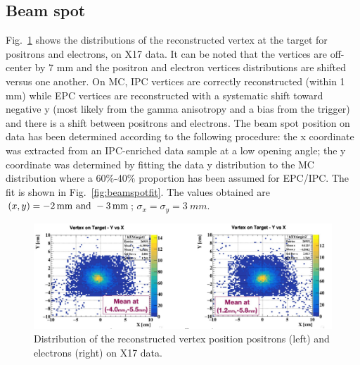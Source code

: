 \begin{refsection}
        \subsection{Beam spot}
        Fig.~\ref{fig:beamspot1} shows the distributions of the reconstructed vertex at the target for positrons and electrons, on X17 data. 
        It can be noted that the vertices are off-center by 7 mm and the positron and electron vertices distributions are shifted versus one another.
        On MC, IPC vertices are correctly reconstructed (within 1 mm) while EPC vertices are reconstructed with a systematic shift toward negative y (most likely from the gamma anisotropy and a bias from the trigger) and there is a shift between positrons and electrons.
        The beam spot position on data has been determined according to the following procedure: the x coordinate was extracted from an IPC-enriched data sample at a low opening angle; the y coordinate was determined by fitting the data y distribution to the MC distribution where a 60$\%$-40$\%$ proportion has been assumed for EPC/IPC. The fit is shown in Fig.~\ref{fig:beamspotfit}.
        The values obtained are $(x, y) = \SIlist{-2; -3}{mm}$; $\sigma_x= \sigma_y = \SI{3}{mm}$.

        \begin{figure}[]
            \centering
            \includegraphics[scale=0.5]{Figures/X17/Analysis/BeamSpotData.pdf}
            \caption[X17: Reconstructed vertex position]{Distribution of the reconstructed vertex position positrons (left) and electrons (right) on X17 data.}
             \label{fig:beamspot1}
        \end{figure}
        

\end{refsection}

